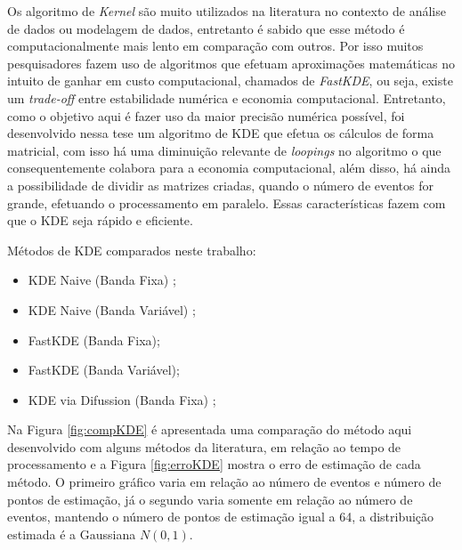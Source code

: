 Os algoritmo de \textit{Kernel} são muito utilizados na literatura no contexto de análise de dados ou modelagem de dados, entretanto é sabido que esse método é computacionalmente mais lento em comparação com outros. Por isso muitos pesquisadores fazem uso de algoritmos que efetuam aproximações matemáticas no intuito de ganhar em custo computacional, chamados de \textit{FastKDE}, ou seja, existe um \textit{trade-off} entre estabilidade numérica e economia computacional. Entretanto, como o objetivo aqui é fazer uso da maior precisão numérica possível, foi desenvolvido nessa tese um algoritmo de KDE que efetua os cálculos de forma matricial, com isso há uma diminuição relevante de \textit{loopings} no algoritmo o que consequentemente colabora para a economia computacional, além disso, há ainda a possibilidade de dividir as matrizes criadas, quando o número de eventos for grande, efetuando o processamento em paralelo. Essas características fazem com que o KDE seja rápido e eficiente. 

Métodos de KDE comparados neste trabalho:

\begin{itemize}
\item KDE Naive (Banda Fixa) \cite{scott2015multivariate};
\item KDE Naive (Banda Variável) \cite{scott2015multivariate};
\item FastKDE (Banda Fixa);
\item FastKDE (Banda Variável);
\item KDE via Difussion (Banda Fixa) \cite{botev2010kernel};
\end{itemize}



Na Figura \ref{fig:compKDE} é apresentada uma comparação do método aqui desenvolvido com alguns métodos da literatura, em relação ao tempo de processamento e a Figura \ref{fig:erroKDE} mostra o erro de estimação de cada método. O primeiro gráfico varia em relação ao número de eventos e número de pontos de estimação, já o segundo varia somente em relação ao número de eventos, mantendo o número de pontos de estimação igual a 64, a distribuição estimada é a Gaussiana $N(0,1)$.

